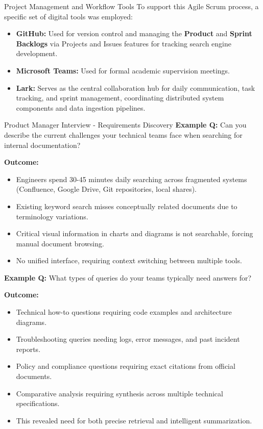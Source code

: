 \begin{frame}{Project Management and Workflow Tools}
To support this Agile Scrum process, a specific set of digital tools was employed:
\begin{itemize}
\item \textbf{GitHub:} Used for version control and managing the \textbf{Product} and \textbf{Sprint Backlogs} via Projects and Issues features for tracking search engine development.
\item \textbf{Microsoft Teams:} Used for formal academic supervision meetings.
\item \textbf{Lark:} Serves as the central collaboration hub for daily communication, task tracking, and sprint management, coordinating distributed system components and data ingestion pipelines.
\end{itemize}
\end{frame}

\begin{frame}{Product Manager Interview - Requirements Discovery}
\scriptsize
\textbf{Example Q:} Can you describe the current challenges your technical teams face when searching for internal documentation?

\textbf{Outcome:}
\begin{itemize}
    \item Engineers spend 30-45 minutes daily searching across fragmented systems (Confluence, Google Drive, Git repositories, local shares).
    \item Existing keyword search misses conceptually related documents due to terminology variations.
    \item Critical visual information in charts and diagrams is not searchable, forcing manual document browsing.
    \item No unified interface, requiring context switching between multiple tools.
\end{itemize}

\vspace{0.5em}
\textbf{Example Q:} What types of queries do your teams typically need answers for?

\textbf{Outcome:}
\begin{itemize}
    \item Technical how-to questions requiring code examples and architecture diagrams.
    \item Troubleshooting queries needing logs, error messages, and past incident reports.
    \item Policy and compliance questions requiring exact citations from official documents.
    \item Comparative analysis requiring synthesis across multiple technical specifications.
    \item This revealed need for both precise retrieval and intelligent summarization.
\end{itemize}
\end{frame}


